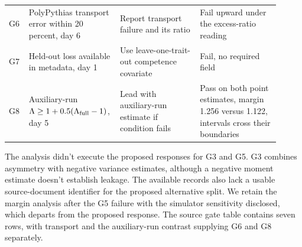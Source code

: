 \begin{table}[!htb]
\begin{tabular}{L{0.07\linewidth}L{0.28\linewidth}L{0.28\linewidth}L{0.28\linewidth}}
G6 & PolyPythias transport error within 20 percent, day 6 & Report transport failure and its ratio & Fail upward under the excess-ratio reading\\
G7 & Held-out loss available in metadata, day 1 & Use leave-one-trait-out competence covariate & Fail, no required field\\
G8 & Auxiliary-run $\Lambda\geq1+0.5(\Lambda_{\rm full}-1)$, day 5 & Lead with auxiliary-run estimate if condition fails & Pass on both point estimates, margin 1.256 versus 1.122, intervals cross their boundaries\\\bottomrule
\end{tabular}
\end{table}

The analysis didn't execute the proposed responses for G3 and G5. G3 combines asymmetry with negative variance estimates, although a negative moment estimate doesn't establish leakage. The available records also lack a usable source-document identifier for the proposed alternative split. We retain the margin analysis after the G5 failure with the simulator sensitivity disclosed, which departs from the proposed response. The source gate table contains seven rows, with transport and the auxiliary-run contrast supplying G6 and G8 separately.

